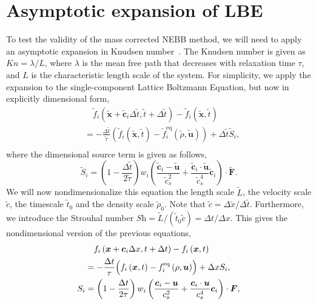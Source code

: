 \documentclass[aps,physrev,twocolumn,10pt]{revtex4-2}
\begin{document}
\section{Asymptotic expansion of LBE}
To test the validity of the mass corrected NEBB method, we will need to apply an asymptotic expansion in Knudsen number~\cite{inamuro_accuracy_1997}. The Knudsen number is given as $\textit{Kn} = \lambda / L$, where $\lambda$ is the mean free path that decreases with relaxation time $\tau$, and $L$ is the characteristic length scale of the system. For simplicity, we apply the expansion to the single-component Lattice Boltzmann Equation, but now in explicitly dimensional form,
\begin{equation}
\begin{split}
    &\quad\tilde{f}_i\left(\tilde{\bm{x}} + \tilde{\bm{c}}_i \Delta \tilde{t}, \tilde{t} + \Delta \tilde{t}\right) - \tilde{f}_i\left(\tilde{\bm{x}}, \tilde{t}\right)\\
    &= -\frac{\Delta \tilde{t}}{\tilde{\tau}}\left(\tilde{f}_i\left(\tilde{\bm{x}}, \tilde{t}\right)  - \tilde{f}^\text{eq}_i\left(\tilde{\rho}, \tilde{\bm{u}}\right)\right) + \Delta \tilde{t} \tilde{S}_i,\\
\end{split}
\end{equation}
where the dimensional source term is given as follows,
\begin{equation}
    \tilde{S}_i =  \left(1 - \frac{\Delta \tilde{t}}{2\tilde{\tau}}\right)w_i \left(\frac{\tilde{\bm{c}}_i - \tilde{\bm{u}}}{\tilde{c}_s^2} + \frac{\tilde{\bm{c}}_i \cdot \tilde{\bm{u}}}{\tilde{c}_s^4}\tilde{\bm{c}}_i\right) \cdot \tilde{\bm{F}}.
\end{equation}
We will now nondimensionalize this equation the length scale $\tilde{L}$, the velocity scale $\tilde{c}$, the timescale $\tilde{t}_0$ and the density scale $\tilde{\rho}_0$. Note that $\tilde{c} = \Delta \tilde{x} / \Delta \tilde{t}$. Furthermore, we introduce the Strouhal number $\textit{Sh} = \tilde{L} / (\tilde{t}_0 \tilde{c}) = \Delta t / \Delta x$. This gives the nondimensional version of the previous equations,
\begin{equation}
\begin{split}
    &\quad f_i\left(\bm{x} + \bm{c}_i \Delta x, t + \Delta t\right) - f_i\left(\bm{x}, t\right)\\
    &= -\frac{\Delta t}{\tau}\Bigl(f_i\left(\bm{x}, t\right)  - f^\text{eq}_i\left(\rho, \bm{u}\right)\Bigr) + \Delta x S_i,\\
    S_i &=  \left(1 - \frac{\Delta t}{2\tau}\right)w_i \left(\frac{\bm{c}_i - \bm{u}}{c_s^2} + \frac{\bm{c}_i \cdot \bm{u}}{c_s^4}\bm{c}_i\right) \cdot \bm{F},
\end{split}
\end{equation}
\end{document}
